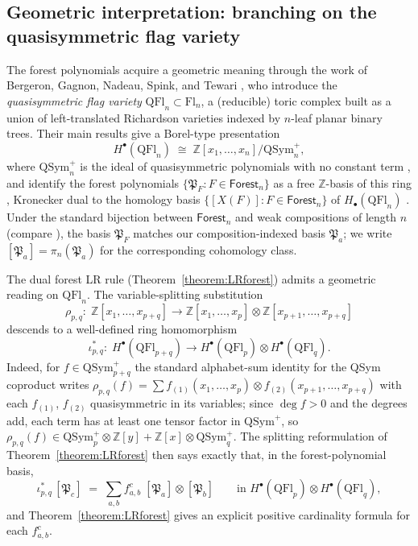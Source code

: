 \documentclass{amsart}
\theoremstyle{definition}
\theoremstyle{remark}
\numberwithin{equation}{subsection}
\newcommand{\forest}{\mathfrak{P}}
\begin{document}
\subsection{Geometric interpretation: branching on the quasisymmetric flag variety}\label{subsection:qflbranch}

The forest polynomials acquire a geometric meaning through the work of Bergeron, Gagnon, Nadeau, Spink, and Tewari \cite{bergeron2025qsymflag}, who introduce the \emph{quasisymmetric flag variety} $\mathrm{QFl}_n\subset \mathrm{Fl}_n$, a (reducible) toric complex built as a union of left-translated Richardson varieties indexed by $n$-leaf planar binary trees. Their main results give a Borel-type presentation
$$H^\bullet(\mathrm{QFl}_n) \;\cong\; \mathbb{Z}[x_1,\ldots,x_n]/\mathrm{QSym}_n^+,$$
where $\mathrm{QSym}_n^+$ is the ideal of quasisymmetric polynomials with no constant term \cite[Theorem~A and Corollary~12.5]{bergeron2025qsymflag}, and identify the forest polynomials $\{\forest_F : F\in \mathsf{Forest}_n\}$ as a free $\mathbb{Z}$-basis of this ring \cite[Corollary~12.5]{bergeron2025qsymflag}, Kronecker dual to the homology basis $\{[X(F)] : F\in\mathsf{Forest}_n\}$ of $H_\bullet(\mathrm{QFl}_n)$ \cite[Corollary~11.6, Theorem~12.12]{bergeron2025qsymflag}. Under the standard bijection between $\mathsf{Forest}_n$ and weak compositions of length $n$ (compare \cite{nadeau2024forest}), the basis $\forest_F$ matches our composition-indexed basis $\forest_a$; we write $[\forest_a]=\pi_n(\forest_a)$ for the corresponding cohomology class.

The dual forest LR rule (Theorem~\ref{theorem:LRforest}) admits a geometric reading on $\mathrm{QFl}_n$. The variable-splitting substitution
$$\rho_{p,q}:\;\mathbb{Z}[x_1,\ldots,x_{p+q}]\longrightarrow \mathbb{Z}[x_1,\ldots,x_p]\otimes \mathbb{Z}[x_{p+1},\ldots,x_{p+q}]$$
descends to a well-defined ring homomorphism
$$\iota_{p,q}^*:\;H^\bullet(\mathrm{QFl}_{p+q})\longrightarrow H^\bullet(\mathrm{QFl}_p)\otimes H^\bullet(\mathrm{QFl}_q).$$
Indeed, for $f\in\mathrm{QSym}_{p+q}^+$ the standard alphabet-sum identity for the QSym coproduct writes $\rho_{p,q}(f) = \sum f_{(1)}(x_1,\ldots,x_p)\otimes f_{(2)}(x_{p+1},\ldots,x_{p+q})$ with each $f_{(1)}$, $f_{(2)}$ quasisymmetric in its variables; since $\deg f>0$ and the degrees add, each term has at least one tensor factor in $\mathrm{QSym}^+$, so $\rho_{p,q}(f)\in \mathrm{QSym}_p^+\otimes\mathbb{Z}[y] + \mathbb{Z}[x]\otimes \mathrm{QSym}_q^+$. The splitting reformulation of Theorem~\ref{theorem:LRforest} then says exactly that, in the forest-polynomial basis,
$$\iota_{p,q}^*\,[\forest_c] \;=\; \sum_{a,b} f_{a,b}^c\;[\forest_a]\otimes [\forest_b]\qquad\text{in } H^\bullet(\mathrm{QFl}_p)\otimes H^\bullet(\mathrm{QFl}_q),$$
and Theorem~\ref{theorem:LRforest} gives an explicit positive cardinality formula for each $f_{a,b}^c$.
\end{document}
